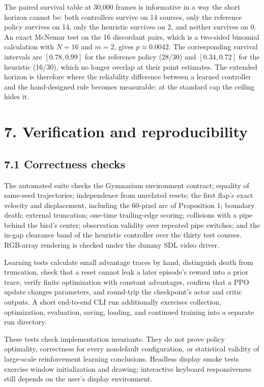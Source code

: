 \documentclass[
  11pt,
]{article}
\begin{document}
The paired survival table at 30,000 frames is informative in a way the
short horizon cannot be: both controllers survive on 14 courses, only
the reference policy survives on 14, only the heuristic survives on 2,
and neither survives on 0. An exact McNemar test on the 16 discordant
pairs, which is a two-sided binomial calculation with \(N=16\) and
\(m=2\), gives \(p\approx0.0042\). The corresponding survival intervals
are \([0.78,0.99]\) for the reference policy (28/30) and \([0.34,0.72]\)
for the heuristic (16/30), which no longer overlap at their point
estimates. The extended horizon is therefore where the reliability
difference between a learned controller and the hand-designed rule
becomes measurable; at the standard cap the ceiling hides it.

\section{7. Verification and
reproducibility}\label{verification-and-reproducibility}

\subsection{7.1 Correctness checks}\label{correctness-checks}

The automated suite checks the Gymnasium environment contract; equality
of same-seed trajectories; independence from unrelated resets; the first
flap's exact velocity and displacement, including the 60-pixel arc of
Proposition 1; boundary death; external truncation; one-time
trailing-edge scoring; collisions with a pipe behind the bird's center;
observation validity over repeated pipe switches; and the in-gap
clearance band of the heuristic controller over the thirty test courses.
RGB-array rendering is checked under the dummy SDL video driver.

Learning tests calculate small advantage traces by hand, distinguish
death from truncation, check that a reset cannot leak a later episode's
reward into a prior trace, verify finite optimization with constant
advantages, confirm that a PPO update changes parameters, and round-trip
the checkpoint's actor and critic outputs. A short end-to-end CLI run
additionally exercises collection, optimization, evaluation, saving,
loading, and continued training into a separate run directory.

These tests check implementation invariants. They do not prove policy
optimality, correctness for every nondefault configuration, or
statistical validity of large-scale reinforcement learning conclusions.
Headless display smoke tests exercise window initialization and drawing;
interactive keyboard responsiveness still depends on the user's display
environment.
\end{document}
